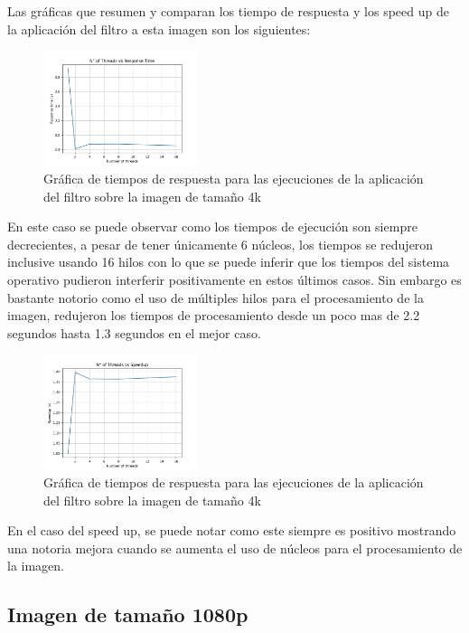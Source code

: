 Las gráficas que resumen y comparan los tiempo de respuesta y los speed up de la aplicación del filtro a esta imagen son los siguientes:

\begin{figure}[H]
    \centering
    \includegraphics[width=0.4\textwidth]{../plots/4k_response_time.png}
    \caption{Gráfica de tiempos de respuesta para las ejecuciones de la aplicación del filtro sobre la imagen de tamaño 4k}
\end{figure}

En este caso se puede observar como los tiempos de ejecución son siempre decrecientes, a pesar de tener únicamente 6 núcleos, los tiempos se redujeron inclusive usando 16 hilos con lo que se puede inferir que los tiempos del sistema operativo pudieron interferir positivamente en estos últimos casos. Sin embargo es bastante notorio como el uso de múltiples hilos para el procesamiento de la imagen, redujeron los tiempos de procesamiento desde un poco mas de 2.2 segundos hasta 1.3 segundos en el mejor caso.

\begin{figure}[H]
    \centering
    \includegraphics[width=0.4\textwidth]{../plots/4k_speedup.png}
    \caption{Gráfica de tiempos de respuesta para las ejecuciones de la aplicación del filtro sobre la imagen de tamaño 4k}
\end{figure}

En el caso del speed up, se puede notar como este siempre es positivo mostrando una notoria mejora cuando se aumenta el uso de núcleos para el procesamiento de la imagen.

\subsection{Imagen de tamaño 1080p}

